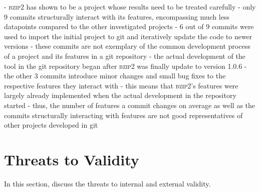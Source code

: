 - \textsc{bzip2} has shown to be a project whose results need to be treated carefully 
- only 9 commits structurally interact with its features, encompassing much less datapoints compared to the other investigated projects
- 6 out of 9 commits were used to import the initial project to git and iteratively update the code to newer versions
- these commits are not exemplary of the common development process of a project and its features in a git repository 
- the actual development of the tool in the git repository began after \textsc{bzip2} was finally update to version 1.0.6
- the other 3 commits introduce minor changes and small bug fixes to the respective features they interact with
- this means that \textsc{bzip2}'s features were largely already implemented when the actual development in the repository started
- thus, the number of features a commit changes on average as well as the commits structurally interacting with features are not good representatives of other projects developed in git



































\section{Threats to Validity}\label{sec:threats}

In this section, discuss the threats to internal and external validity.

